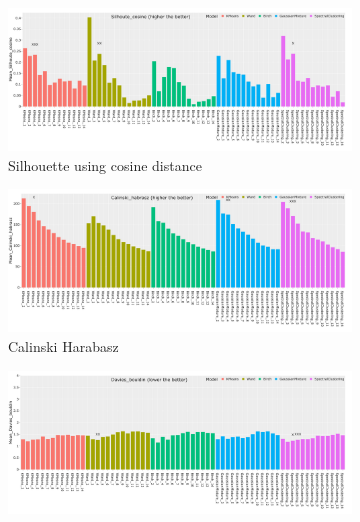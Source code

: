 \begin{figure}[H]
    \captionsetup[subfigure]{justification=Centering}
    \centering
    \begin{subfigure}[!t]{1.0\textwidth}
        \includegraphics[width=\textwidth]{Sections/Network_II/resources/reward/cluster_analysis/allComs_top3_Silhoute_cosine.png}
        \caption{Silhouette using cosine distance}
        \label{fig:ap:n_II:cosine}
    \end{subfigure}
    \centering
    \begin{subfigure}[!t]{1.0\textwidth}
        \includegraphics[width=\textwidth]{Sections/Network_II/resources/reward/cluster_analysis/allComs_top3_Calinski_habrasz.png}
        \caption{Calinski Harabasz}
        \label{fig:ap:n_II:cal_hab}
    \end{subfigure}
    \centering
    \begin{subfigure}[!t]{1.0\textwidth}
        \includegraphics[width=\textwidth]{Sections/Network_II/resources/reward/cluster_analysis/allComs_top3_Davies_bouldin.png}

\end{subfigure}
\end{figure}

